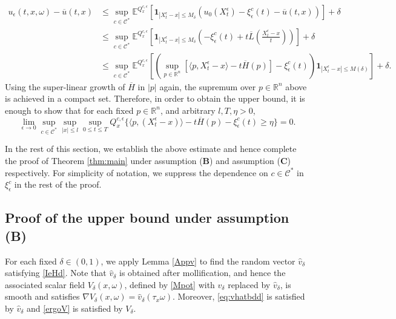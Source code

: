 \documentclass[11pt,reqno]{amsart}
\theoremstyle{definition}
\theoremstyle{remark}
\numberwithin{equation}{section}
\newcommand{\eps}{\epsilon}
\newcommand{\R}{{\mathbb{R}}}
\newcommand{\ol}{\overline}
\begin{document}
\begin{equation*}
\begin{aligned}
     u_{\epsilon}(t,x,\omega) - \ol{u}(t,x) &\leq  \sup_{c\in\mathscr{C}^{\ast}} \mathbb{E}^{Q^{c,\epsilon}_{x} }\left[\mathbf{1}_{|X^\eps_t-x|\le M_\delta} \left(u_0(X^\eps_t)-\xi^c_\eps(t) - \ol{u}(t,x)\right)\right] + \delta\\
     &\leq  \sup_{c\in\mathscr{C}^{\ast}} \mathbb{E}^{Q^{c,\epsilon}_{x} }\left[\mathbf{1}_{|X^\eps_t-x|\le M_\delta} \left(-\xi^c_\eps(t) + t\ol{L}\left(\frac{X^\eps_t-x}{t}\right)\right)\right] + \delta\\
    &\leq  \sup_{c\in\mathscr{C}^{\ast}} \mathbb{E}^{Q^{c,\epsilon}_{x} }[(\sup_{p\in\mathbb{R}^n}[\langle p, X^{\epsilon}_{t} -x \rangle - t\overline{H}(p)]- \xi^c_{\epsilon}(t))\mathbf{1}_{ |X^{\epsilon}_{t}-x| \leq M(\delta)}] + \delta.
    \end{aligned}
\end{equation*}
Using the super-linear growth of $\ol{H}$ in $|p|$ again, the supremum over $p\in \R^n$ above is achieved in a compact set. Therefore, in order to obtain the upper bound, it is enough to show that for each fixed $p\in\mathbb{R}^n$, and arbitrary $l, T, \eta>0$,
\begin{equation}\label{uppE}
    \lim_{\epsilon\to 0}\sup_{c\in\mathscr{C}^{\ast}} \sup_{|x| \leq l} \sup_{0 \leq t \leq T} Q^{c, \epsilon}_{x} \{ \langle p, (X^{\epsilon}_{t} -x) \rangle - t\overline{H}(p)- \xi^c_{\epsilon}(t) \geq \eta \} = 0.
\end{equation}

In the rest of this section, we establish the above estimate and hence complete the proof of Theorem \ref{thm:main} under assumption ({\bf B}) and assumption ({\bf C}) respectively. For simplicity of notation, we suppress the dependence on $c\in \mathscr{C}^*$ in $\xi^c_\eps$ in the rest of the proof. %
\medskip 

\subsection{Proof of the upper bound under assumption ({\bf B})}

For each fixed $\delta \in (0,1)$, we apply Lemma \ref{Appv} to find the random vector $\hat{v}_\delta$ satisfying \eqref{IeHd}. Note that $\hat{v}_\delta$ is obtained after mollification, and hence the associated scalar field $V_\delta(x,\omega)$, defined by \eqref{Mpot} with $v_\delta$ replaced by $\hat{v}_\delta$, is smooth and satisfies $\nabla V_\delta(x,\omega) = \hat{v}_\delta(\tau_x\omega)$. Moreover, \eqref{eq:vhatbdd} is satisfied by $\hat{v}_\delta$ and \eqref{ergoV} is satisfied by $V_\delta$. 
\end{document}
